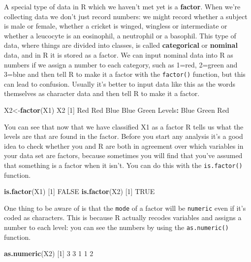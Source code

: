 \documentclass[
]{book}
\newenvironment{Shaded}{\begin{snugshade}}{\end{snugshade}}
\newcommand{\DecValTok}[1]{\textcolor[rgb]{0.00,0.00,0.81}{#1}}
\newcommand{\KeywordTok}[1]{\textcolor[rgb]{0.13,0.29,0.53}{\textbf{#1}}}
\newcommand{\NormalTok}[1]{#1}
\newcommand{\OperatorTok}[1]{\textcolor[rgb]{0.81,0.36,0.00}{\textbf{#1}}}
\newcommand{\OtherTok}[1]{\textcolor[rgb]{0.56,0.35,0.01}{#1}}
\newcommand{\StringTok}[1]{\textcolor[rgb]{0.31,0.60,0.02}{#1}}
\begin{document}
A special type of data in R which we haven't met yet is a \textbf{factor}. When we're collecting data we don't just record numbers: we might record whether a subject is male or female, whether a cricket is winged, wingless or intermediate or whether a leucocyte is an eosinophil, a neutrophil or a basophil. This type of data, where things are divided into classes, is called \textbf{categorical} or \textbf{nominal} data, and in R it is stored as a factor. We can input nominal data into R as numbers if we assign a number to each category, such as 1=red, 2=green and 3=blue and then tell R to make it a factor with the \texttt{factor()} function, but this can lead to confusion. Usually it's better to input data like this as the words themselves as character data and then tell R to make it a factor.

\begin{Shaded}
\begin{Highlighting}[]
\NormalTok{X2<-}\KeywordTok{factor}\NormalTok{(X1)}
\NormalTok{X2}
\NormalTok{[}\DecValTok{1}\NormalTok{] Red   Red   Blue  Blue  Green}
\NormalTok{Levels}\OperatorTok{:}\StringTok{ }\NormalTok{Blue Green Red}
\end{Highlighting}
\end{Shaded}

You can see that now that we have classified X1 as a factor R tells us what the levels are that are found in the factor. Before you start any analysis it's a good idea to check whether you and R are both in agreement over which variables in your data set are factors, because sometimes you will find that you've assumed that something is a factor when it isn't. You can do this with the \texttt{is.factor()} function.

\begin{Shaded}
\begin{Highlighting}[]
\KeywordTok{is.factor}\NormalTok{(X1)}
\NormalTok{[}\DecValTok{1}\NormalTok{] }\OtherTok{FALSE}
\KeywordTok{is.factor}\NormalTok{(X2)}
\NormalTok{[}\DecValTok{1}\NormalTok{] }\OtherTok{TRUE}
\end{Highlighting}
\end{Shaded}

One thing to be aware of is that the \texttt{mode} of a factor will be \texttt{numeric} even if it's coded as characters. This is because R actually recodes variables and assigns a number to each level: you can see the numbers by using the \texttt{as.numeric()} function.

\begin{Shaded}
\begin{Highlighting}[]
\KeywordTok{as.numeric}\NormalTok{(X2)}
\NormalTok{[}\DecValTok{1}\NormalTok{] }\DecValTok{3} \DecValTok{3} \DecValTok{1} \DecValTok{1} \DecValTok{2}
\end{Highlighting}
\end{Shaded}
\end{document}
